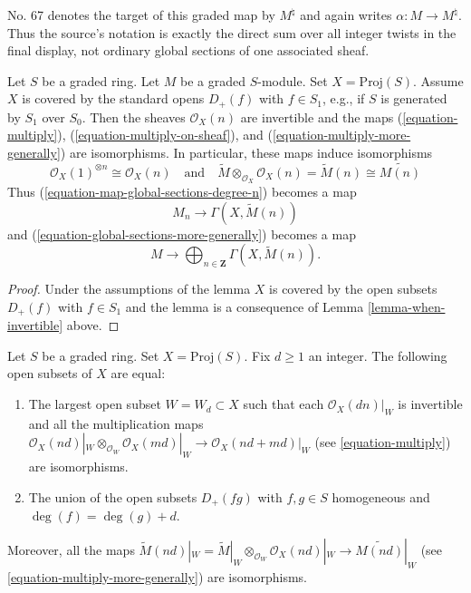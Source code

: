 \begin{lemma}
\begin{history}
No. 67 denotes the target of this graded map by $M^\natural$ and again
writes $\alpha:M\to M^\natural$. Thus the source's notation is exactly the
direct sum over all integer twists in the final display, not ordinary global
sections of one associated sheaf.
\end{history}
Let $S$ be a graded ring. Let $M$ be a graded $S$-module.
Set $X = \text{Proj}(S)$. Assume $X$ is covered by the standard
opens $D_+(f)$ with $f \in S_1$, e.g., if $S$ is generated by $S_1$
over $S_0$. Then the sheaves $\mathcal{O}_X(n)$
are invertible and the maps
(\ref{equation-multiply}), (\ref{equation-multiply-on-sheaf}), and
(\ref{equation-multiply-more-generally}) are isomorphisms.
In particular, these maps induce isomorphisms
$$
\mathcal{O}_X(1)^{\otimes n} \cong
\mathcal{O}_X(n)
\quad
\text{and}
\quad
\widetilde{M} \otimes_{\mathcal{O}_X} \mathcal{O}_X(n) =
\widetilde{M}(n) \cong \widetilde{M(n)}
$$
Thus (\ref{equation-map-global-sections-degree-n}) becomes a map
\begin{equation}
\label{equation-map-global-sections-degree-n-simplified}
M_n \longrightarrow \Gamma(X, \widetilde{M}(n))
\end{equation}
and (\ref{equation-global-sections-more-generally}) becomes a map
\begin{equation}
\label{equation-global-sections-more-generally-simplified}
M \longrightarrow
\bigoplus\nolimits_{n \in \mathbf{Z}} \Gamma(X, \widetilde{M}(n)).
\end{equation}
\end{lemma}

\begin{proof}
Under the assumptions of the lemma $X$ is covered by the
open subsets $D_{+}(f)$ with $f \in S_1$ and the
lemma is a consequence of Lemma \ref{lemma-when-invertible} above.
\end{proof}

\begin{lemma}
\label{lemma-where-invertible}
Let $S$ be a graded ring. Set $X = \text{Proj}(S)$. Fix $d \geq 1$ an
integer. The following open subsets of $X$ are equal:
\begin{enumerate}
\item The largest open subset $W = W_d \subset X$ such that
each $\mathcal{O}_X(dn)|_W$ is invertible and all the
multiplication maps
$\mathcal{O}_X(nd)|_W \otimes_{\mathcal{O}_W} \mathcal{O}_X(md)|_W
\to \mathcal{O}_X(nd + md)|_W$
(see \ref{equation-multiply}) are isomorphisms.
\item The union of the open subsets $D_{+}(fg)$ with
$f, g \in S$ homogeneous and $\deg(f) = \deg(g) + d$.
\end{enumerate}
Moreover, all the maps
$\widetilde M(nd)|_W = \widetilde M|_W \otimes_{\mathcal{O}_W}
\mathcal{O}_X(nd)|_W \to \widetilde{M(nd)}|_W$
(see \ref{equation-multiply-more-generally}) are isomorphisms.
\end{lemma}

